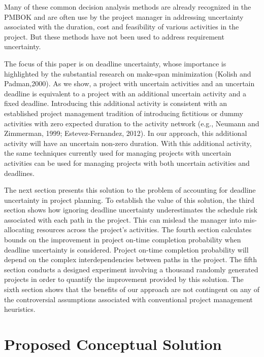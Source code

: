 \documentclass[11pt]{article}
\begin{document}
Many of these common decision analysis methods are already recognized in the PMBOK and are often use by the project manager in addressing uncertainty associated with the duration, cost and feasibility of various activities in the project. But these methods have not been used to address requirement uncertainty.   \par
The focus of this paper is on deadline uncertainty, whose importance is highlighted by the substantial research on make-span minimization (Kolish and Padman,2000).    As we show, a project with uncertain activities and an uncertain deadline is equivalent to a project with an additional uncertain activity and a fixed deadline.  Introducing this additional activity is consistent with an established project management tradition of introducing fictitious or dummy activities with zero expected duration to the activity network (e.g., Neumann and Zimmerman, 1999; Estevez-Fernandez, 2012).  In our approach, this additional activity will have an uncertain non-zero duration. With this additional activity, the same techniques currently used for managing projects with uncertain activities can be used for managing projects with both uncertain activities and  deadlines. \par
The next section presents this solution to the problem of accounting for deadline uncertainty in project planning. To establish the value of this solution, the third section shows how ignoring deadline uncertainty underestimates the schedule risk associated with each path in the project.  This can mislead the manager into mis-allocating resources across the project's activities.  The fourth section calculates bounds on the improvement in project on-time completion probability when deadline uncertainty is considered. Project on-time completion probability will depend on the complex  interdependencies between paths in the project.
The fifth section conducts a designed experiment involving a thousand randomly generated projects in order to quantify the improvement provided by this solution. The sixth section shows that the benefits of our approach are not contingent on any of the controversial assumptions associated with conventional project management heuristics.  
\section{Proposed Conceptual Solution}
\end{document}
